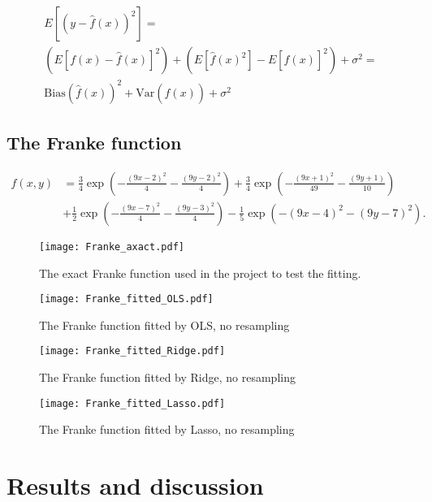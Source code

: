 \documentclass[10pt]{article}
\begin{document}
\begin{eqnarray}
	E[(y - \hat f(x))^2] = \\ \left(E[f(x) - \hat f(x)]^2\right)+ \left(E[\hat f(x)^2] - E[\hat f(x)]^2\right) + \sigma^2 =\\ \text{Bias}(\hat f(x))^2 + \text{Var}(\hat f(x)) + \sigma^2
\end{eqnarray}
\subsection{The Franke function}
\begin{align*}
f(x,y) &= \frac{3}{4}\exp{\left(-\frac{(9x-2)^2}{4} - \frac{(9y-2)^2}{4}\right)}+\frac{3}{4}\exp{\left(-\frac{(9x+1)^2}{49}- \frac{(9y+1)}{10}\right)} \\
&+\frac{1}{2}\exp{\left(-\frac{(9x-7)^2}{4} - \frac{(9y-3)^2}{4}\right)} -\frac{1}{5}\exp{\left(-(9x-4)^2 - (9y-7)^2\right)}.
\end{align*}

\begin{figure}
	\centerline{\texttt{[image: Franke\_axact.pdf]}}
		\label{plt:Franke_exact}
		\caption{The exact Franke function used in the project to test the fitting.}
\end{figure}

\begin{figure}
	\centerline{\texttt{[image: Franke\_fitted\_OLS.pdf]}}
	\label{plt:Franke_fitted_OLS}
	\caption{The  Franke function fitted by OLS, no resampling}
\end{figure}

\begin{figure}
	\centerline{\texttt{[image: Franke\_fitted\_Ridge.pdf]}}
	\label{plt:Franke_fitted_Ridge}
	\caption{The  Franke function fitted by Ridge, no resampling}
\end{figure}

\begin{figure}
	\centerline{\texttt{[image: Franke\_fitted\_Lasso.pdf]}}
	\label{plt:Franke_fitted_Lasso}
	\caption{The  Franke function fitted by Lasso, no resampling}
\end{figure}

\section{Results and discussion} \label{Results}
\end{document}
